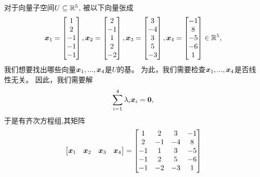 \begin{example}[确定基]
    对于向量子空间$U \subseteq \mathbb{R}^5$, 被以下向量张成
    \begin{equation}
        \boldsymbol{x}_1=
        \begin{bmatrix}
            1 \\ 2 \\ -1 \\ -1 \\ -1
        \end{bmatrix},
        \boldsymbol{x}_2=
        \begin{bmatrix}
            2 \\ -1 \\ 1 \\ 2 \\ -2
        \end{bmatrix},
        \boldsymbol{x}_3=
        \begin{bmatrix}
            3 \\ -4 \\ 3 \\ 5 \\ -3
        \end{bmatrix},
        \boldsymbol{x}_4=
        \begin{bmatrix}
            -1 \\ 8 \\ -5 \\ -6 \\ 1
        \end{bmatrix}
        \in \mathbb{R}^5,
    \end{equation}
    我们想要找出哪些向量$\boldsymbol{x}_1 ,..., \boldsymbol{x}_4$是$U$的基。
    为此，我们需要检查$\boldsymbol{x}_1 ,..., \boldsymbol{x}_4$是否线性无关。
    因此，我们需要解
    \begin{equation}
        \sum_{i=1}^{4} \lambda_i \boldsymbol{x}_i = \boldsymbol{0},
    \end{equation}
    于是有齐次方程组,其矩阵
    \begin{equation}
        \begin{bmatrix}
            \boldsymbol{x}_1 & \boldsymbol{x}_2 & \boldsymbol{x}_3 & \boldsymbol{x}_4
        \end{bmatrix} =
        \begin{bmatrix}
           1 & 2 & 3 & -1 \\
           2 & -1 & -4 & 8 \\
          -1 & 1 & 3 & -5 \\
          -1 & 2 & 5 & -6 \\
          -1 & -2 & -3 & 1 \\

\end{bmatrix}
\end{equation}
\end{example}
